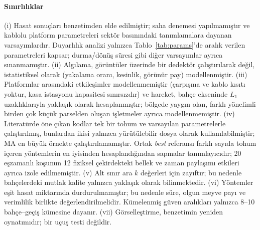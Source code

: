 \paragraph{Sınırlılıklar} (i) Hasat sonuçları benzetimden elde edilmiştir; saha denemesi
yapılmamıştır ve kablolu platform parametreleri sektör basınındaki tanımlamalara dayanan
varsayımlardır. Duyarlılık analizi yalnızca Tablo~\ref{tab:params}'de aralık verilen
parametreleri kapsar; durma/dönüş süresi gibi diğer varsayımlar ayrıca sınanmamıştır.
(ii) Algılama, görüntüler üzerinde bir dedektör çalıştırılarak değil, istatistiksel olarak
(yakalama oranı, kesinlik, görünür pay) modellenmiştir. (iii) Platformlar arasındaki etkileşimler
modellenmemiştir (çarpışma ve kablo kısıtı yoktur, kasa istasyonu kapasitesi sınırsızdır) ve
hareket, bahçe ekseninde $L_1$ uzaklıklarıyla yaklaşık olarak hesaplanmıştır; bölgede yaygın olan,
farklı yönelimli birden çok küçük parselden oluşan işletmeler ayrıca modellenmemiştir.
(iv) Literatürde öne çıkan kodlar tek bir tohum ve varsayılan parametrelerle çalıştırılmış,
bunlardan ikisi yalnızca yürütülebilir dosya olarak kullanılabilmiştir; MA en büyük örnekte
çalıştırılamamıştır. Ortak \emph{best} referansı farklı sayıda tohum içeren yöntemlerin en
iyisinden hesaplandığından sapmalar tanımlayıcıdır; 20 eşzamanlı koşunun 12 fiziksel
çekirdekteki bellek ve zaman paylaşımı etkileri ayrıca izole edilmemiştir.
(v) Alt sınır ara $k$ değerleri için zayıftır; bu nedenle bahçelerdeki mutlak kalite yalnızca
yaklaşık olarak bilinmektedir. (vi) Yöntemler eşit hasat miktarında durdurulmamıştır; bu
nedenle süre, olgun meyve payı ve verimlilik birlikte değerlendirilmelidir. Kümelenmiş
güven aralıkları yalnızca 8--10 bahçe--geçiş kümesine dayanır. (vii) Görselleştirme,
benzetimin yeniden oynatımıdır; bir uçuş testi değildir.
